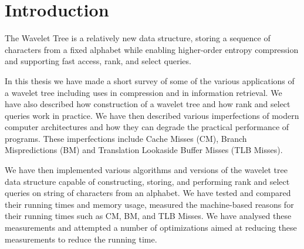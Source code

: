 \section{Introduction}
The Wavelet Tree is a relatively new data structure, storing a sequence of characters from a fixed alphabet while enabling higher-order entropy compression and supporting fast access, rank, and select queries.


In this thesis we have made a short survey of some of the various applications of a wavelet tree including uses in compression and in information retrieval.
We have also described how construction of a wavelet tree and how rank and select queries work in practice.
We have then described various imperfections of modern computer architectures and how they can degrade the practical performance of programs.
These imperfections include Cache Misses (CM), Branch Mispredictions (BM) and Translation Lookaside Buffer Misses (TLB Misses).

We have then implemented various algorithms and versions of the wavelet tree data structure capable of constructing, storing, and performing rank and select queries on string of characters from an alphabet. We have tested and compared their running times and memory usage, measured the machine-based reasons for their running times such as CM, BM, and TLB Misses. We have analysed these measurements and attempted a number of optimizations aimed at reducing these measurements to reduce the running time.

